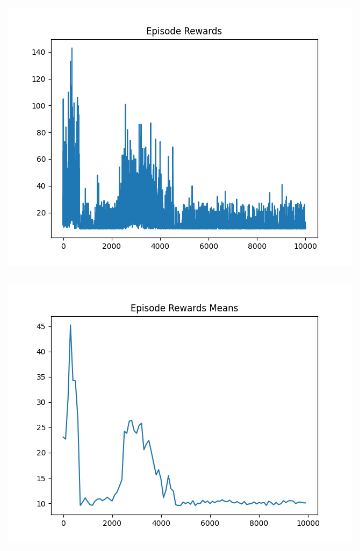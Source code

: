 \begin{figure}[H]
    \centering
    \begin{subfigure}{.47\linewidth}
        \centering
        \includegraphics[width=\textwidth]{pole/2024-06-13_17-34-57_dqn_cartpole_episode_rewards.png}
    \end{subfigure}
    \begin{subfigure}{.47\linewidth}
        \centering
        \includegraphics[width=\textwidth]{pole/2024-06-13_17-34-57_dqn_cartpole_episode_rewards_means.png}
    \end{subfigure}
    \begin{subfigure}{.47\linewidth}
        \centering

\end{subfigure}
\end{figure}

